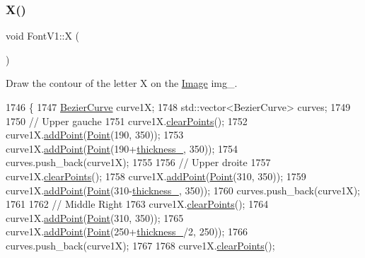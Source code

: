 \subsubsection{\texorpdfstring{X()}{X()}}
{\footnotesize\ttfamily void Font\+V1\+::X (\begin{DoxyParamCaption}{ }\end{DoxyParamCaption})}



Draw the contour of the letter X on the \mbox{\hyperlink{class_image}{Image}} img\+\_\+. 


\begin{DoxyCode}
1746               \{
1747     \mbox{\hyperlink{class_bezier_curve}{BezierCurve}} curve1X;
1748     std::vector<BezierCurve> curves;
1749 
1750     \textcolor{comment}{// Upper gauche}
1751     curve1X.\mbox{\hyperlink{class_bezier_curve_a0ba8ce66d5af5971ae6a1b506029728e}{clearPoints}}();
1752     curve1X.\mbox{\hyperlink{class_bezier_curve_a38d16c18b36ae45619b05e26e226cf34}{addPoint}}(\mbox{\hyperlink{class_point}{Point}}(190, 350));
1753     curve1X.\mbox{\hyperlink{class_bezier_curve_a38d16c18b36ae45619b05e26e226cf34}{addPoint}}(\mbox{\hyperlink{class_point}{Point}}(190+\mbox{\hyperlink{class_font_v1_aed8040e76be9a52833627b92f0fb4e5f}{thickness\_}}, 350));
1754     curves.push\_back(curve1X);
1755 
1756     \textcolor{comment}{// Upper droite}
1757     curve1X.\mbox{\hyperlink{class_bezier_curve_a0ba8ce66d5af5971ae6a1b506029728e}{clearPoints}}();
1758     curve1X.\mbox{\hyperlink{class_bezier_curve_a38d16c18b36ae45619b05e26e226cf34}{addPoint}}(\mbox{\hyperlink{class_point}{Point}}(310, 350));
1759     curve1X.\mbox{\hyperlink{class_bezier_curve_a38d16c18b36ae45619b05e26e226cf34}{addPoint}}(\mbox{\hyperlink{class_point}{Point}}(310-\mbox{\hyperlink{class_font_v1_aed8040e76be9a52833627b92f0fb4e5f}{thickness\_}}, 350));
1760     curves.push\_back(curve1X);
1761 
1762     \textcolor{comment}{// Middle Right}
1763     curve1X.\mbox{\hyperlink{class_bezier_curve_a0ba8ce66d5af5971ae6a1b506029728e}{clearPoints}}();
1764     curve1X.\mbox{\hyperlink{class_bezier_curve_a38d16c18b36ae45619b05e26e226cf34}{addPoint}}(\mbox{\hyperlink{class_point}{Point}}(310, 350));
1765     curve1X.\mbox{\hyperlink{class_bezier_curve_a38d16c18b36ae45619b05e26e226cf34}{addPoint}}(\mbox{\hyperlink{class_point}{Point}}(250+\mbox{\hyperlink{class_font_v1_aed8040e76be9a52833627b92f0fb4e5f}{thickness\_}}/2, 250));
1766     curves.push\_back(curve1X);
1767 
1768     curve1X.\mbox{\hyperlink{class_bezier_curve_a0ba8ce66d5af5971ae6a1b506029728e}{clearPoints}}();

\end{DoxyCode}
